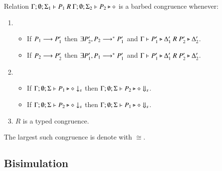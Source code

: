 \begin{definition}
	Relation $\Gamma; \emptyset; \Sigma_1 \vdash P_1 \ R\ \Gamma; \emptyset; \Sigma_2 \vdash P_2 \triangleright \diamond$ is a barbed congruence
	whenever:
	\begin{enumerate}
		\item
		\begin{itemize}
			\item	If $P_1 \longrightarrow P_1'$ then $\exists P_2', P_2 \longrightarrow^* P_1'$ and $\Gamma \vdash P_1' \triangleright \Delta_1'\ R\ P_2' \triangleright \Delta_2'$.
			\item	If $P_2 \longrightarrow P_2'$ then $\exists P_1', P_1 \longrightarrow^* P_1'$ and $\Gamma \vdash P_1' \triangleright \Delta_1'\ R\ P_2' \triangleright \Delta_2'$.
		\end{itemize}
		\item
		\begin{itemize}
			\item	If $\Gamma;\emptyset;\Sigma \vdash P_1 \triangleright \diamond \downarrow_{s}$ then $\Gamma;\emptyset;\Sigma \vdash P_2 \triangleright \diamond \Downarrow_{s}$.
			\item	If $\Gamma;\emptyset;\Sigma \vdash P_2 \triangleright \diamond \downarrow_{s}$ then $\Gamma;\emptyset;\Sigma \vdash P_1 \triangleright \diamond \Downarrow_{s}$.
		\end{itemize}
		\item	$R$ is a typed congruence.
	\end{enumerate}
	The largest such congruence is denote with $\cong$.
\end{definition}

\subsection{Bisimulation}


